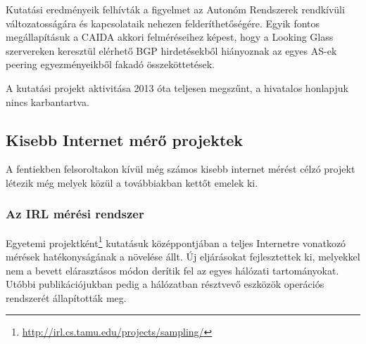 Kutatási eredményeik felhívták a figyelmet az Autonóm Rendszerek rendkívüli változatosságára és kapcsolataik nehezen felderíthetőségére. Egyik fontos megállapításuk a CAIDA akkori felméréseihez képest, hogy a Looking Glass szervereken keresztül elérhető BGP hirdetésekből hiányoznak az egyes AS-ek peering egyezményeikből fakadó összeköttetések.

A kutatási projekt aktivitása 2013 óta teljesen megszűnt, a hivatalos honlapjuk nincs karbantartva.


\subsection{Kisebb Internet mérő projektek}

A fentiekben felsoroltakon kívül még számos kisebb internet mérést célzó projekt létezik még melyek közül a továbbiakban kettőt emelek ki.

\subsubsection*{Az IRL mérési rendszer}
 
 
Egyetemi projektként\footnote{\url{http://irl.cs.tamu.edu/projects/sampling/}} kutatásuk középpontjában a teljes Internetre vonatkozó mérések hatékonyságának a növelése állt. Új eljárásokat fejlesztettek ki, melyekkel nem a bevett elárasztásos módon derítik fel az egyes hálózati tartományokat. Utóbbi publikációjukban\cite{irl-measure} pedig a hálózatban résztvevő eszközök operációs rendszerét állapították meg.
 



